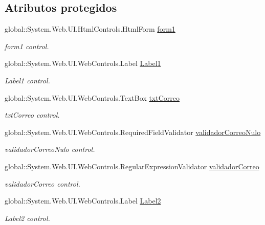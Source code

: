 \subsection*{Atributos protegidos}
\begin{DoxyCompactItemize}
\item 
global\+::\+System.\+Web.\+U\+I.\+Html\+Controls.\+Html\+Form \mbox{\hyperlink{classwebprueba_1_1_inicio_a768017299cb17002e414ba64833c0426}{form1}}
\begin{DoxyCompactList}\small\item\em form1 control. \end{DoxyCompactList}\item 
global\+::\+System.\+Web.\+U\+I.\+Web\+Controls.\+Label \mbox{\hyperlink{classwebprueba_1_1_inicio_a58d92a2b20d6ea0170c271e7bb775b39}{Label1}}
\begin{DoxyCompactList}\small\item\em Label1 control. \end{DoxyCompactList}\item 
global\+::\+System.\+Web.\+U\+I.\+Web\+Controls.\+Text\+Box \mbox{\hyperlink{classwebprueba_1_1_inicio_ae3b3a310c1ddb8c2c2498daf2004ebd0}{txt\+Correo}}
\begin{DoxyCompactList}\small\item\em txt\+Correo control. \end{DoxyCompactList}\item 
global\+::\+System.\+Web.\+U\+I.\+Web\+Controls.\+Required\+Field\+Validator \mbox{\hyperlink{classwebprueba_1_1_inicio_af5a8fe42f19dccc296ea067be723f15a}{validador\+Correo\+Nulo}}
\begin{DoxyCompactList}\small\item\em validador\+Correo\+Nulo control. \end{DoxyCompactList}\item 
global\+::\+System.\+Web.\+U\+I.\+Web\+Controls.\+Regular\+Expression\+Validator \mbox{\hyperlink{classwebprueba_1_1_inicio_a37542bf07283e9a8fa7640c3ca969749}{validador\+Correo}}
\begin{DoxyCompactList}\small\item\em validador\+Correo control. \end{DoxyCompactList}\item 
global\+::\+System.\+Web.\+U\+I.\+Web\+Controls.\+Label \mbox{\hyperlink{classwebprueba_1_1_inicio_aa2261abf2e8043070afc5685f35ce672}{Label2}}
\begin{DoxyCompactList}\small\item\em Label2 control. \end{DoxyCompactList}\item 

\end{DoxyCompactItemize}
